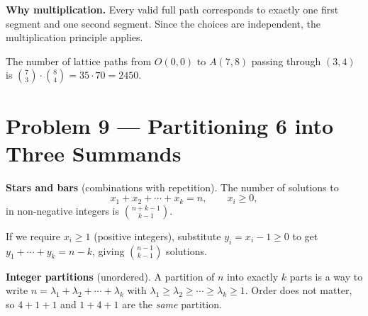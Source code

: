 \documentclass[12pt, a4paper]{article}
\begin{document}
\textbf{Why multiplication.}\; Every valid full path corresponds to exactly one first segment and one second segment. Since the choices are independent, the multiplication principle applies.

\begin{answerbox}
\centering
The number of lattice paths from $O(0,0)$ to $A(7,8)$ passing through $(3,4)$
is $\binom{7}{3} \cdot \binom{8}{4} = 35 \cdot 70 = \boxed{2450}$.
\end{answerbox}

\newpage
\section{Problem 9 --- Partitioning 6 into Three Summands}

\begin{theorybox}
\textbf{Stars and bars} (combinations with repetition).\;
The number of solutions to
\[
  x_1 + x_2 + \cdots + x_k = n, \qquad x_i \ge 0,
\]
in non-negative integers is
$\displaystyle\binom{n+k-1}{k-1}$.

\medskip
If we require $x_i \ge 1$ (positive integers), substitute $y_i = x_i - 1 \ge 0$
to get $y_1 + \cdots + y_k = n - k$, giving
$\displaystyle\binom{n-1}{k-1}$ solutions.

\begin{center}
\end{center}

\medskip
\textbf{Integer partitions} (unordered).\;
A partition of $n$ into exactly $k$ parts is a way to write
$n = \lambda_1 + \lambda_2 + \cdots + \lambda_k$ with
$\lambda_1 \ge \lambda_2 \ge \cdots \ge \lambda_k \ge 1$.
Order does not matter, so $4+1+1$ and $1+4+1$ are the \emph{same} partition.
\end{theorybox}
\end{document}
